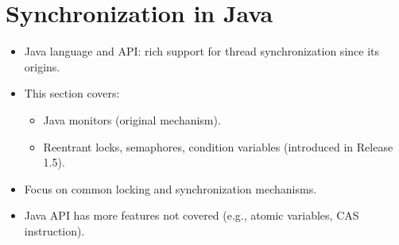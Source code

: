 \section{Synchronization in Java}

\begin{itemize}
    \item Java language and API: rich support for thread synchronization since its origins.
    \item This section covers:
    \begin{itemize}
        \item Java monitors (original mechanism).
        \item Reentrant locks, semaphores, condition variables (introduced in Release 1.5).
    \end{itemize}
    \item Focus on common locking and synchronization mechanisms.
    \item Java API has more features not covered (e.g., atomic variables, CAS instruction).
\end{itemize}


